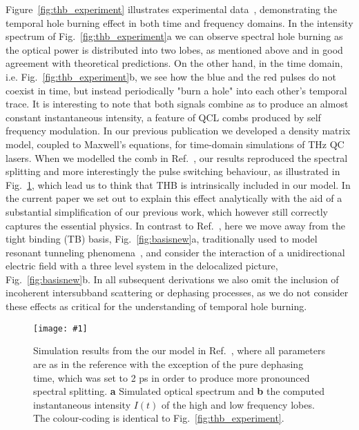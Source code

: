 \documentclass[reprint,secnumarabic,amssymb, nobibnotes, aip, prd]{revtex4-1}
\newcommand{\vspacec}{\vspace{-0.3cm}}
\newcommand{\includegraphicsXL}[1]{\texttt{[image: \#1]}}
\begin{document}
\vspacec
Figure~\ref{fig:thb_experiment} illustrates experimental data~\cite{burghoff2015evaluating}, demonstrating the temporal hole burning effect in both time and frequency domains. In the intensity spectrum of Fig.~\ref{fig:thb_experiment}a we can observe spectral hole burning as the optical power is distributed into two lobes, as mentioned above and in good agreement with theoretical predictions. On the other hand, in the time domain, i.e. Fig.~\ref{fig:thb_experiment}b, we see how the blue and the red pulses do not coexist in time, but instead periodically "burn a hole" into each other's temporal trace. It is interesting to note that both signals combine as to produce an almost constant instantaneous intensity, a feature of QCL combs produced by self frequency modulation\cite{khurgin2014coherent}. In our previous publication \cite{petz2016} we developed a density matrix model, coupled to Maxwell's equations, for time-domain simulations of THz QC lasers. When we modelled the comb in Ref.~, our results reproduced the spectral splitting and more interestingly the pulse switching behaviour, as illustrated in Fig.~\ref{fig:thb_simulation}, which lead us to think that THB is intrinsically included in our model. In the current paper we set out to explain this effect analytically with the aid of a substantial simplification of our previous work, which however still correctly captures the essential physics. In contrast to Ref.~, here we move away from the tight binding (TB) basis, Fig.~\ref{fig:basisnew}a, traditionally used to model resonant tunneling phenomena~\cite{callebaut2005importance}, and consider the interaction of a unidirectional electric field with a three level system in the delocalized picture, Fig.~\ref{fig:basisnew}b. In all subsequent derivations we also omit the inclusion of incoherent intersubband scattering or dephasing processes, as we do not consider these effects as critical for the understanding of temporal hole burning. 
\begin{figure}[h!]
	\begin{center}
		\includegraphicsXL{IMGS/sim_10p8_small2.eps}
		\caption{Simulation results from the our model in Ref.~, where all parameters are as in the reference with the exception of the pure dephasing time, which was set to 2 ps in order to produce more pronounced spectral splitting. \textbf{a} Simulated optical spectrum and \textbf{b} the computed instantaneous intensity $I(t)$ of the high and low frequency lobes. The colour-coding is identical to Fig.~\ref{fig:thb_experiment}.}\label{fig:thb_simulation}
	\end{center}	
\end{figure}
\end{document}
